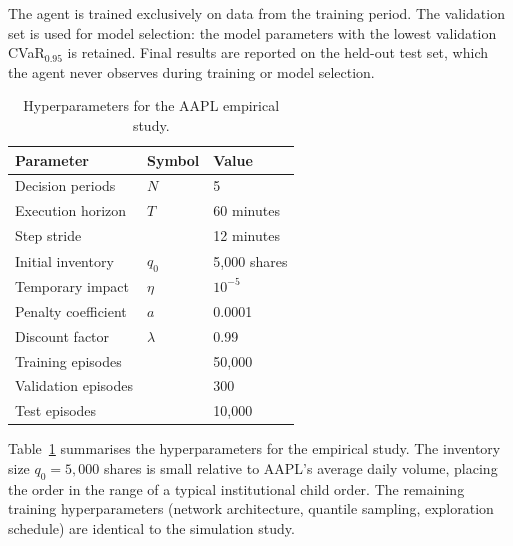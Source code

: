 \documentclass[11pt]{article}
\begin{document}
The agent is trained exclusively on data from the training period.  The validation set is used for model selection: the model parameters with the lowest validation CVaR$_{0.95}$ is retained.  Final results are reported on the held-out test set, which the agent never observes during training or model selection.



\begin{table}[H]
    \centering
    
    \begin{tabular}{@{}lll@{}}
        \toprule
        \textbf{Parameter} & \textbf{Symbol} & \textbf{Value} \\
        \midrule
        Decision periods           & $N$             & 5 \\
        Execution horizon          & $T$             & 60 minutes \\
        Step stride                &                 & 12 minutes \\
        Initial inventory          & $q_0$           & 5{,}000 shares \\
        Temporary impact           & $\eta$          & $10^{-5}$ \\
        Penalty coefficient        & $a$             & 0.0001 \\
        Discount factor            & $\lambda$       & 0.99 \\
        \midrule
        Training episodes          &                 & 50{,}000 \\
        Validation episodes        &                 & 300 \\
        Test episodes              &                 & 10{,}000 \\
        \bottomrule
    \end{tabular}
    \caption{Hyperparameters for the AAPL empirical study.}
    \label{tab:taq_params}
\end{table}


Table~\ref{tab:taq_params} summarises the hyperparameters for the empirical study. The inventory size $q_0 = 5{,}000$ shares is small relative 
to AAPL's average daily volume, placing the order in the 
range of a typical institutional child order.  The remaining training hyperparameters (network architecture, quantile sampling, exploration schedule) are identical to the simulation study.
\end{document}

